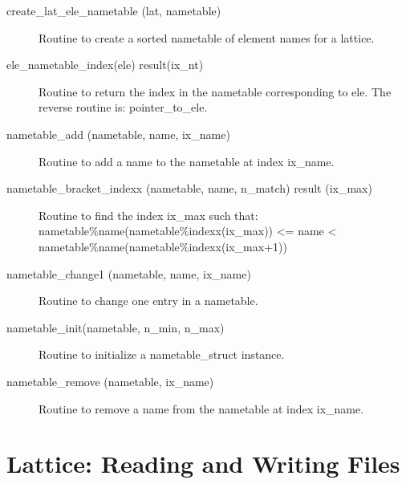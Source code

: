 \begin{description}

\label{r:create.lat.ele.nametable}
\item[create_lat_ele_nametable (lat, nametable)] \Newline 
Routine to create a sorted nametable of element names for a lattice.

\label{r:ele.nametable.index}
\item[ele_nametable_index(ele) result(ix_nt)] \Newline 
Routine to return the index in the nametable corresponding to ele.
The reverse routine is: pointer_to_ele.

\label{r:nametable.add}
\item[nametable_add (nametable, name, ix_name)] \Newline 
Routine to add a name to the nametable at index ix_name.

\label{r:nametable.bracket.indexx}
\item[nametable_bracket_indexx (nametable, name, n_match) result (ix_max)] \Newline 
Routine to find the index ix_max such that:
  nametable\%name(nametable\%indexx(ix_max)) <= name < nametable\%name(nametable\%indexx(ix_max+1))

\label{r:nametable.change1}
\item[nametable_change1 (nametable, name, ix_name)] \Newline 
Routine to change one entry in a nametable.

\label{r:nametable.init}
\item[nametable_init(nametable, n_min, n_max)] \Newline 
Routine to initialize a nametable_struct instance.

\label{r:nametable.remove}
\item[nametable_remove (nametable, ix_name)] \Newline 
Routine to remove a name from the nametable at index ix_name.

\end{description}

\section{Lattice: Reading and Writing Files} 
\label{r:lat.read}

